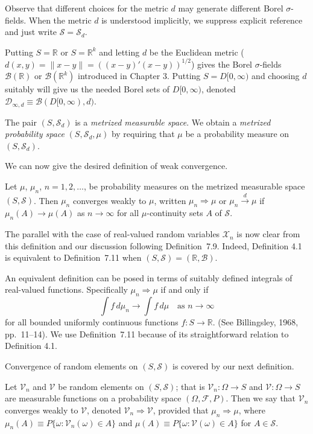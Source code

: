 Observe that different choices for the metric $d$ may generate different Borel $\sigma$-fields. When the metric $d$ is understood implicitly, we suppress explicit reference and just write $\mathcal{S} = \mathcal{S}_d$.

Putting $S = \mathbb{R}$ or $S = \mathbb{R}^k$ and letting $d$ be the Euclidean metric ($d(x,y) = \|x - y\| = ((x-y)'(x-y))^{1/2}$) gives the Borel $\sigma$-fields $\mathcal{B}(\mathbb{R})$ or $\mathcal{B}(\mathbb{R}^k)$ introduced in Chapter 3. Putting $S = D[0,\infty)$ and choosing $d$ suitably will give us the needed Borel sets of $D[0,\infty)$, denoted $\mathcal{D}_{\infty,d} \equiv \mathcal{B}(D[0,\infty), d)$.

The pair $(S, \mathcal{S}_d)$ is a \emph{metrized measurable space}. We obtain a \emph{metrized probability space} $(S, \mathcal{S}_d, \mu)$ by requiring that $\mu$ be a probability measure on $(S, \mathcal{S}_d)$.

We can now give the desired definition of weak convergence.

\begin{definition}\label{def:weak-convergence}
Let $\mu$, $\mu_n$, $n = 1, 2, \ldots$, be probability measures on the metrized measurable space $(S, \mathcal{S})$. Then $\mu_n$ converges weakly to $\mu$, written $\mu_n \Rightarrow \mu$ or $\mu_n \xrightarrow{d} \mu$ if $\mu_n(A) \to \mu(A)$ as $n \to \infty$ for all $\mu$-continuity sets $A$ of $\mathcal{S}$.
\end{definition}

The parallel with the case of real-valued random variables $\mathcal{X}_n$ is now clear from this definition and our discussion following Definition~7.9. Indeed, Definition 4.1 is equivalent to Definition~7.11 when $(S, \mathcal{S}) = (\mathbb{R}, \mathcal{B})$.

An equivalent definition can be posed in terms of suitably defined integrals of real-valued functions. Specifically $\mu_n \Rightarrow \mu$ if and only if
\[
\int f\,d\mu_n \to \int f\,d\mu \quad \text{as } n \to \infty
\]
for all bounded uniformly continuous functions $f : S \to \mathbb{R}$. (See Billingsley, 1968, pp.\ 11--14). We use Definition~7.11 because of its straightforward relation to Definition 4.1.

Convergence of random elements on $(S, \mathcal{S})$ is covered by our next definition.

\begin{definition}\label{def:weak-convergence-random-elements}
Let $\mathcal{V}_n$ and $\mathcal{V}$ be random elements on $(S, \mathcal{S})$; that is $\mathcal{V}_n : \Omega \to S$ and $\mathcal{V} : \Omega \to S$ are measurable functions on a probability space $(\Omega, \mathcal{F}, P)$. Then we say that $\mathcal{V}_n$ converges weakly to $\mathcal{V}$, denoted $\mathcal{V}_n \Rightarrow \mathcal{V}$, provided that $\mu_n \Rightarrow \mu$, where $\mu_n(A) \equiv P\{\omega : \mathcal{V}_n(\omega) \in A\}$ and $\mu(A) \equiv P\{\omega : \mathcal{V}(\omega) \in A\}$ for $A \in \mathcal{S}$.
\end{definition}

